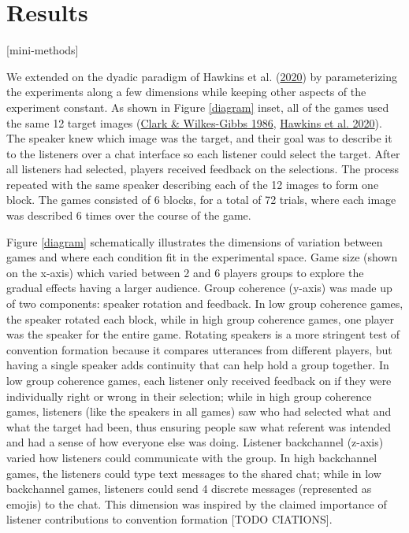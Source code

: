 \documentclass[
  english,
  a4paper,
]{article}
\begin{document}
\hypertarget{results}{%
\section{Results}\label{results}}

{[}mini-methods{]}

We extended on the dyadic paradigm of Hawkins et al. (\protect\hyperlink{ref-hawkinsCharacterizingDynamicsLearning2020}{2020}) by parameterizing the experiments along a few dimensions while keeping other aspects of the experiment constant. As shown in Figure \ref{diagram} inset, all of the games used the same 12 target images (\protect\hyperlink{ref-clarkReferringCollaborativeProcess1986}{Clark \& Wilkes-Gibbs 1986}, \protect\hyperlink{ref-hawkinsCharacterizingDynamicsLearning2020}{Hawkins et al. 2020}). The speaker knew which image was the target, and their goal was to describe it to the listeners over a chat interface so each listener could select the target. After all listeners had selected, players received feedback on the selections. The process repeated with the same speaker describing each of the 12 images to form one block. The games consisted of 6 blocks, for a total of 72 trials, where each image was described 6 times over the course of the game.

Figure \ref{diagram} schematically illustrates the dimensions of variation between games and where each condition fit in the experimental space. Game size (shown on the x-axis) which varied between 2 and 6 players groups to explore the gradual effects having a larger audience. Group coherence (y-axis) was made up of two components: speaker rotation and feedback. In low group coherence games, the speaker rotated each block, while in high group coherence games, one player was the speaker for the entire game. Rotating speakers is a more stringent test of convention formation because it compares utterances from different players, but having a single speaker adds continuity that can help hold a group together. In low group coherence games, each listener only received feedback on if they were individually right or wrong in their selection; while in high group coherence games, listeners (like the speakers in all games) saw who had selected what and what the target had been, thus ensuring people saw what referent was intended and had a sense of how everyone else was doing. Listener backchannel (z-axis) varied how listeners could communicate with the group. In high backchannel games, the listeners could type text messages to the shared chat; while in low backchannel games, listeners could send 4 discrete messages (represented as emojis) to the chat. This dimension was inspired by the claimed importance of listener contributions to convention formation {[}TODO CIATIONS{]}.
\end{document}
